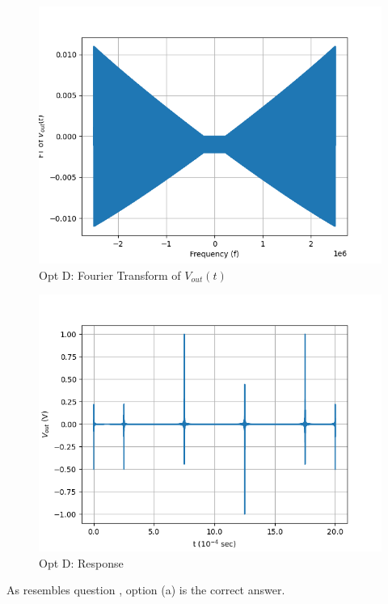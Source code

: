 \documentclass[journal,12pt,twocolumn]{IEEEtran}
\theoremstyle{remark}
\begin{document}
\begin{figure}[!h]
    \centering
    \includegraphics[width = \columnwidth]{2023/PH/37/figs/opt_d_ft.png}
    \caption{Opt D: Fourier Transform of $V_{out}(t)$}
    \label{fig:d_ft_gate.ph.23.37}
\end{figure}
\begin{figure}[!h]
    \centering
    \includegraphics[width = \columnwidth]{2023/PH/37/figs/opt_d_res.png}
    \caption{Opt D: Response}
    \label{fig:d_res_gate.ph.23.37}
\end{figure}

As  resembles question , option (a) is the correct answer.
\end{document}
